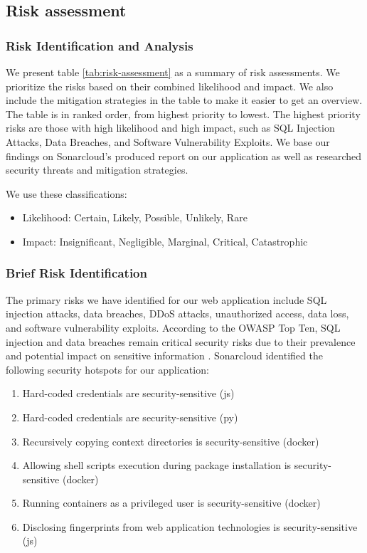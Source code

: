 \documentclass[11pt]{article}
\begin{document}
\subsection{Risk assessment}
\subsubsection{Risk Identification and Analysis}
 We present table \ref{tab:risk-assessment} as a summary of risk assessments. We prioritize the risks based on their combined likelihood and impact. We also include the mitigation strategies in the table to make it easier to get an overview. The table is in ranked order, from highest priority to lowest. The highest priority risks are those with high likelihood and high impact, such as SQL Injection Attacks, Data Breaches, and Software Vulnerability Exploits. We base our findings on Sonarcloud's produced report on our application as well as researched security threats and mitigation strategies.
 
We use these classifications: 
\begin{itemize}
    \item Likelihood: {Certain, Likely, Possible, Unlikely, Rare}
    \item Impact: {Insignificant, Negligible, Marginal, Critical, Catastrophic}
\end{itemize}

\subsubsection{Brief Risk Identification}
The primary risks  we have identified for our web application include SQL injection attacks, data breaches, DDoS attacks, unauthorized access, data loss, and software vulnerability exploits. According to the OWASP Top Ten, SQL injection and data breaches remain critical security risks due to their prevalence and potential impact on sensitive information \citep{owasp_top_ten}. Sonarcloud identified the following security hotspots for our application:

\begin{enumerate}
    \item Hard-coded credentials are security-sensitive (js) 
    \item Hard-coded credentials are security-sensitive (py)
    \item Recursively copying context directories is security-sensitive (docker)
    \item Allowing shell scripts execution during package installation is security-sensitive (docker)
    \item Running containers as a privileged user is security-sensitive (docker)
    \item Disclosing fingerprints from web application technologies is security-sensitive (js)
\end{enumerate}
\end{document}
